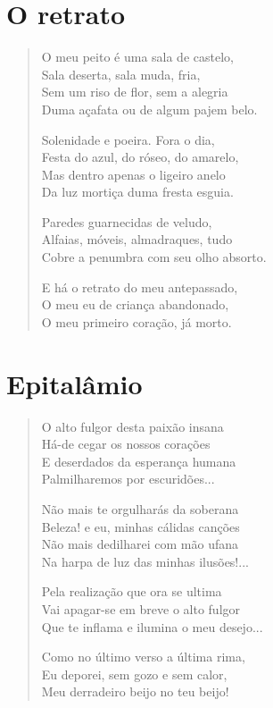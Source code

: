 \chapter{O retrato}

\begin{verse}
O meu peito é uma sala de castelo,\\
Sala deserta, sala muda, fria,\\
Sem um riso de flor, sem a alegria\\
Duma açafata ou de algum pajem belo.

Solenidade e poeira. Fora o dia,\\
Festa do azul, do róseo, do amarelo,\\
Mas dentro apenas o ligeiro anelo\\
Da luz mortiça duma fresta esguia.

Paredes guarnecidas de veludo,\\
Alfaias, móveis, almadraques, tudo\\
Cobre a penumbra com seu olho absorto.

E há o retrato do meu antepassado,\\
O meu eu de criança abandonado,\\
O meu primeiro coração, já morto.
\end{verse}

\chapter{Epitalâmio}

\begin{verse}
O alto fulgor desta paixão insana\\
Há-de cegar os nossos corações\\
E deserdados da esperança humana\\
Palmilharemos por escuridões...

Não mais te orgulharás da soberana\\
Beleza! e eu, minhas cálidas canções\\
Não mais dedilharei com mão ufana\\
Na harpa de luz das minhas ilusões!...

Pela realização que ora se ultima\\
Vai apagar-se em breve o alto fulgor\\
Que te inflama e ilumina o meu desejo...

Como no último verso a última rima,\\
Eu deporei, sem gozo e sem calor,\\
Meu derradeiro beijo no teu beijo!
\end{verse}

